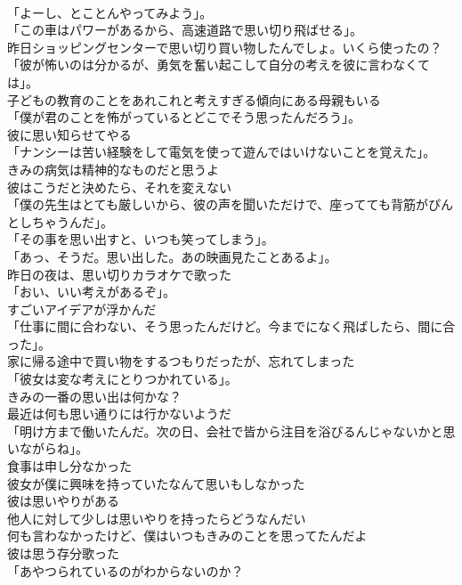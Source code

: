 \documentclass[8pt]{extreport}
\begin{document}
\begin{CJK}{UTF8}{min}
\\	「よーし、とことんやってみよう」。	
\\	「この車はパワーがあるから、高速道路で思い切り飛ばせる」。	
\\	昨日ショッピングセンターで思い切り買い物したんでしょ。いくら使ったの？	
\\	「彼が怖いのは分かるが、勇気を奮い起こして自分の考えを彼に言わなくては」。	
\\	子どもの教育のことをあれこれと考えすぎる傾向にある母親もいる	
\\	「僕が君のことを怖がっているとどこでそう思ったんだろう」。	
\\	彼に思い知らせてやる	
\\	「ナンシーは苦い経験をして電気を使って遊んではいけないことを覚えた」。	
\\	きみの病気は精神的なものだと思うよ	
\\	彼はこうだと決めたら、それを変えない	
\\	「僕の先生はとても厳しいから、彼の声を聞いただけで、座ってても背筋がぴんとしちゃうんだ」。	
\\	「その事を思い出すと、いつも笑ってしまう」。	
\\	「あっ、そうだ。思い出した。あの映画見たことあるよ」。	
\\	昨日の夜は、思い切りカラオケで歌った	
\\	「おい、いい考えがあるぞ」。	
\\	すごいアイデアが浮かんだ	
\\	「仕事に間に合わない、そう思ったんだけど。今までになく飛ばしたら、間に合った」。	
\\	家に帰る途中で買い物をするつもりだったが、忘れてしまった	
\\	「彼女は変な考えにとりつかれている」。	
\\	きみの一番の思い出は何かな？	
\\	最近は何も思い通りには行かないようだ	
\\	「明け方まで働いたんだ。次の日、会社で皆から注目を浴びるんじゃないかと思いながらね」。	
\\	食事は申し分なかった	
\\	彼女が僕に興味を持っていたなんて思いもしなかった	
\\	彼は思いやりがある	
\\	他人に対して少しは思いやりを持ったらどうなんだい	
\\	何も言わなかったけど、僕はいつもきみのことを思ってたんだよ	
\\	彼は思う存分歌った	
\\	「あやつられているのがわからないのか？	

\end{CJK}
\end{document}
